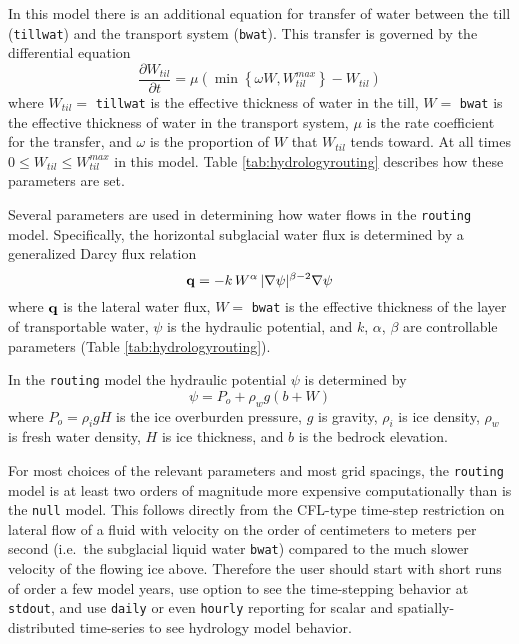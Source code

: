 In this model there is an additional equation for transfer of water between the till (\texttt{tillwat}) and the transport system (\texttt{bwat}).  This transfer is governed by the differential equation
\begin{equation}  \label{eq:hydrologytransfer}
  \frac{\partial W_{til}}{\partial t} = \mu \left(\min\left\{\omega W,W_{til}^{max}\right\} - W_{til}\right)
\end{equation}
where $W_{til}=$ \texttt{tillwat} is the effective thickness of water in the till, $W=$ \texttt{bwat} is the effective thickness of water in the transport system, $\mu$ is the rate coefficient for the transfer, and $\omega$ is the proportion of $W$ that $W_{til}$ tends toward.  At all times $0 \le W_{til} \le W_{til}^{max}$ in this model.  Table \ref{tab:hydrologyrouting} describes how these parameters are set.

Several parameters are used in determining how water flows in the \texttt{routing} model.  Specifically, the horizontal subglacial water flux is determined by a generalized Darcy flux relation \cite{Clarke05,Schoofetal2012}
\begin{equation}  \label{eq:flux}
\mathbf{q} = - k\, W^\alpha\, |\nabla \psi|^{\beta-2} \nabla \psi
\end{equation}
where $\mathbf{q}$ is the lateral water flux, $W=$ \texttt{bwat} is the effective thickness of the layer of transportable water, $\psi$ is the hydraulic potential, and $k$, $\alpha$, $\beta$ are controllable parameters (Table \ref{tab:hydrologyrouting}).

In the \texttt{routing} model the hydraulic potential $\psi$ is determined by
\begin{equation}
\psi = P_o + \rho_w g (b + W)  \label{eq:hydraulicpotential}
\end{equation}
where $P_o=\rho_i g H$ is the ice overburden pressure, $g$ is gravity, $\rho_i$ is ice density, $\rho_w$ is fresh water density, $H$ is ice thickness, and $b$ is the bedrock elevation.

For most choices of the relevant parameters and most grid spacings, the \texttt{routing} model is at least two orders of magnitude more expensive computationally than is the \texttt{null} model.  This follows directly from the CFL-type time-step restriction on lateral flow of a fluid with velocity on the order of centimeters to meters per second (i.e.~the subglacial liquid water \texttt{bwat}) compared to the much slower velocity of the flowing ice above.  Therefore the user should start with short runs of order a few model years, use option  to see the time-stepping behavior at \texttt{stdout}, and use \texttt{daily} or even \texttt{hourly} reporting for scalar and spatially-distributed time-series to see hydrology model behavior.

